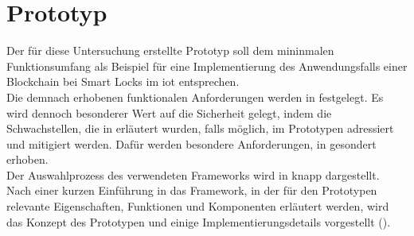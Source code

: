 \section{Prototyp}
\label{sec:prototype}
    Der für diese Untersuchung erstellte Prototyp soll dem mininmalen Funktionsumfang als Beispiel für eine Implementierung des Anwendungsfalls einer Blockchain bei Smart Locks im \gls{iot} entsprechen.\\
    Die demnach erhobenen funktionalen Anforderungen werden in  festgelegt. 
    Es wird dennoch besonderer Wert auf die Sicherheit gelegt, indem die Schwachstellen, die in  erläutert wurden, falls möglich, im Prototypen adressiert und mitigiert werden. 
    Dafür werden besondere Anforderungen, in  gesondert erhoben.\\
    Der Auswahlprozess des verwendeten Frameworks wird in  knapp dargestellt. 
    Nach einer kurzen Einführung in das Framework, in der für den Prototypen relevante Eigenschaften, Funktionen und Komponenten erläutert werden, wird das Konzept des Prototypen und einige Implementierungsdetails vorgestellt (). 
